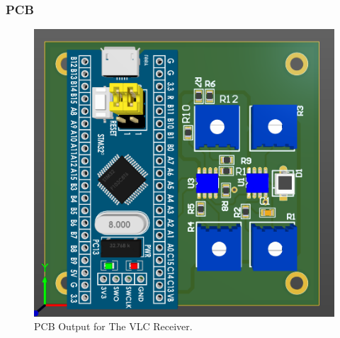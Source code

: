 \subsubsection{PCB}
\begin{figure}[h!]
	\centering
	\includegraphics[scale=0.5]{Figures/HW/pcb-vlc.png}
	\caption{PCB Output for The VLC Receiver.}
	\label{fig:hw-vlc-pcb}
\end{figure}

